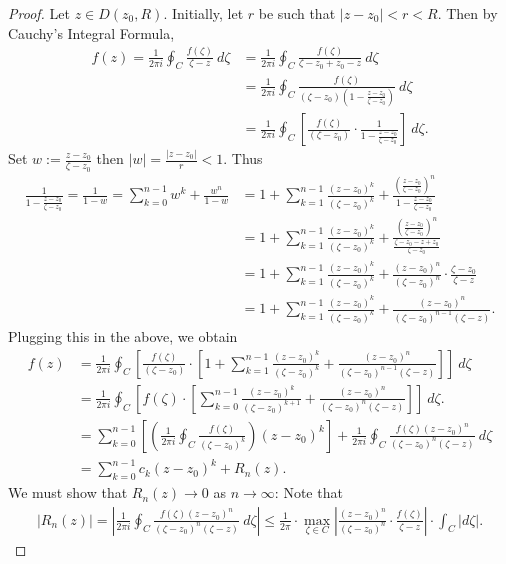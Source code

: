 \documentclass[12pt,openany]{book}
\theoremstyle{definition}
\newcommand{\of}[1]{\left( #1 \right)}
\newcommand{\abs}[1]{\left\lvert #1 \right\rvert}
\begin{document}
	\begin{proof}
		Let $z\in D(z_0,R)$. Initially, let $r$ be such that $\abs{z-z_0}<r<R$. Then by Cauchy's Integral Formula, \begin{align*}
			f(z)=\frac{1}{2\pi i}\oint_C\frac{f\of{\zeta}}{\zeta-z}\ d\zeta&=\frac{1}{2\pi i}\oint_C\frac{f\of{\zeta}}{\zeta-z_0+z_0-z}\ d\zeta\\
			&=\frac{1}{2\pi i}\oint_C\frac{f\of{\zeta}}{\of{\zeta-z_0}\of{\displaystyle 1-\frac{z-z_0}{\zeta-z_0}}}\ d\zeta\\
			&=\frac{1}{2\pi i}\oint_C\left[\frac{f\of{\zeta}}{\of{\zeta-z_0}}\cdot\frac{1}{\displaystyle 1-\frac{z-z_0}{\zeta-z_0}}\right]\ d\zeta.
		\end{align*} Set $w:=\displaystyle\frac{z-z_0}{\zeta-z_0}$ then $\abs{w}=\displaystyle\frac{\abs{z-z_0}}{r}<1$. Thus \begin{align*}
		\frac{1}{\displaystyle 1-\frac{z-z_0}{\zeta-z_0}}=\frac{1}{1-w}=\sum_{k=0}^{n-1}w^k+\frac{w^n}{1-w}
		&=1+\sum_{k=1}^{n-1}\frac{\of{z-z_0}^k}{\of{\zeta-z_0}^k}+\frac{\of{\displaystyle\frac{z-z_0}{\zeta-z_0}}^n}{1-\displaystyle\frac{z-z_0}{\zeta-z_0}}\\
		&=1+\sum_{k=1}^{n-1}\frac{\of{z-z_0}^k}{\of{\zeta-z_0}^k}+\frac{\of{\displaystyle\frac{z-z_0}{\zeta-z_0}}^n}{\displaystyle\frac{\zeta -z_0-z+z_0}{\zeta-z_0}}\\
		&=1+\sum_{k=1}^{n-1}\frac{\of{z-z_0}^k}{\of{\zeta-z_0}^k}+\frac{\of{z-z_0}^n}{\of{\zeta-z_0}^n}\cdot\frac{\zeta-z_0}{\zeta-z}\\
		&=1+\sum_{k=1}^{n-1}\frac{\of{z-z_0}^k}{\of{\zeta-z_0}^k}+\frac{\of{z-z_0}^n}{\of{\zeta-z_0}^{n-1}\of{\zeta-z}}.
		\end{align*}
		Plugging this in the above, we obtain \begin{align*}
		f(z)&=\frac{1}{2\pi i}\oint_C\left[\frac{f\of{\zeta}}{\of{\zeta-z_0}}\cdot\left[1+\sum_{k=1}^{n-1}\frac{\of{z-z_0}^k}{\of{\zeta-z_0}^k}+\frac{\of{z-z_0}^n}{\of{\zeta-z_0}^{n-1}\of{\zeta-z}}\right]\right]\ d\zeta\\
		&=\frac{1}{2\pi i}\oint_C\left[f\of{\zeta}\cdot\left[\sum_{k=0}^{n-1}\frac{\of{z-z_0}^k}{\of{\zeta-z_0}^{k+1}}+\frac{\of{z-z_0}^n}{\of{\zeta-z_0}^n\of{\zeta-z}}\right]\right]\ d\zeta.\\
		&=\sum_{k=0}^{n-1}\left[\of{\frac{1}{2\pi i}\oint_C\frac{f\of{\zeta}}{\of{\zeta-z_0}^k}}\of{z-z_0}^k\right]+\frac{1}{2\pi i}\oint_C\frac{f\of{\zeta}\of{z-z_0}^n}{\of{\zeta-z_0}^n\of{\zeta- z}}\ d\zeta\\
		&=\sum_{k=0}^{n-1}c_k\of{z-z_0}^k+R_n(z).
		\end{align*} We must show that $R_n(z)\to 0$ as $n\to\infty$: Note that \begin{align*}
		\abs{R_n(z)}=\abs{\frac{1}{2\pi i}\oint_C\frac{f\of{\zeta}\of{z-z_0}^n}{\of{\zeta-z_0}^n\of{\zeta- z}}\ d\zeta}\leq \frac{1}{2\pi}\cdot\max_{\zeta\in C}\abs{\frac{\of{z-z_0}^n}{\of{\zeta-z_0}^n}\cdot\frac{f\of{\zeta}}{\zeta-z}}\cdot\int_C\abs{d\zeta}.
	\end{align*}
	\end{proof}
		
\end{document}
